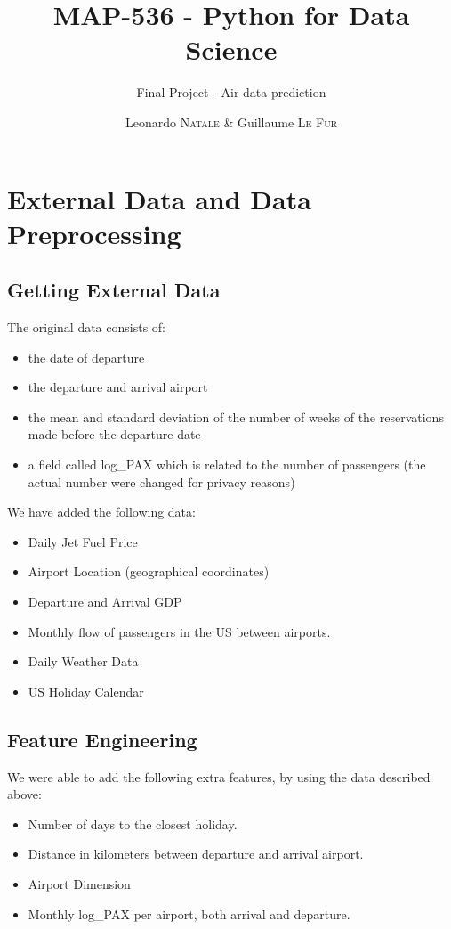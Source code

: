 \documentclass[a4paper,12pt,twoside]{article}
\title{MAP-536 - Python for Data Science}
\subtitle{Final Project - Air data prediction}
\author{Leonardo \textsc{Natale} \& Guillaume \textsc{Le Fur}}
\begin{document}
\maketitle

\section{External Data and Data Preprocessing}

\subsection{Getting External Data}
The original data consists of:
\begin{itemize}
	\item the date of departure
	\item the departure and arrival airport
	\item the mean and standard deviation of the number of weeks of the reservations made before the departure date
    \item a field called log\_PAX which is related to the number of passengers (the actual number were changed for privacy reasons)
\end{itemize}
We have added the following data:
\begin{itemize}
	\item Daily Jet Fuel Price
	\item Airport Location (geographical coordinates)
	\item Departure and Arrival GDP
	\item Monthly flow of passengers in the US between airports.
	\item Daily Weather Data
	\item US Holiday Calendar
\end{itemize}

\subsection{Feature Engineering}

We were able to add the following extra features, by using the data described above:
\begin{itemize}
	\item Number of days to the closest holiday.
	\item Distance in kilometers between departure and arrival airport.
	\item Airport Dimension
	\item Monthly log\_PAX per airport, both arrival and departure.
\end{itemize}
\end{document}
